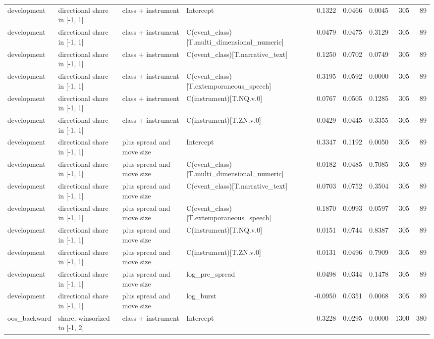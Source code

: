 \begin{tabular}{llllrrrrr}
development & directional share in [-1, 1] & class + instrument & Intercept & 0.1322 & 0.0466 & 0.0045 & 305 & 89 \\
development & directional share in [-1, 1] & class + instrument & C(event_class)[T.multi_dimensional_numeric] & 0.0479 & 0.0475 & 0.3129 & 305 & 89 \\
development & directional share in [-1, 1] & class + instrument & C(event_class)[T.narrative_text] & 0.1250 & 0.0702 & 0.0749 & 305 & 89 \\
development & directional share in [-1, 1] & class + instrument & C(event_class)[T.extemporaneous_speech] & 0.3195 & 0.0592 & 0.0000 & 305 & 89 \\
development & directional share in [-1, 1] & class + instrument & C(instrument)[T.NQ.v.0] & 0.0767 & 0.0505 & 0.1285 & 305 & 89 \\
development & directional share in [-1, 1] & class + instrument & C(instrument)[T.ZN.v.0] & -0.0429 & 0.0445 & 0.3355 & 305 & 89 \\
development & directional share in [-1, 1] & plus spread and move size & Intercept & 0.3347 & 0.1192 & 0.0050 & 305 & 89 \\
development & directional share in [-1, 1] & plus spread and move size & C(event_class)[T.multi_dimensional_numeric] & 0.0182 & 0.0485 & 0.7085 & 305 & 89 \\
development & directional share in [-1, 1] & plus spread and move size & C(event_class)[T.narrative_text] & 0.0703 & 0.0752 & 0.3504 & 305 & 89 \\
development & directional share in [-1, 1] & plus spread and move size & C(event_class)[T.extemporaneous_speech] & 0.1870 & 0.0993 & 0.0597 & 305 & 89 \\
development & directional share in [-1, 1] & plus spread and move size & C(instrument)[T.NQ.v.0] & 0.0151 & 0.0744 & 0.8387 & 305 & 89 \\
development & directional share in [-1, 1] & plus spread and move size & C(instrument)[T.ZN.v.0] & 0.0131 & 0.0496 & 0.7909 & 305 & 89 \\
development & directional share in [-1, 1] & plus spread and move size & log_pre_spread & 0.0498 & 0.0344 & 0.1478 & 305 & 89 \\
development & directional share in [-1, 1] & plus spread and move size & log_burst & -0.0950 & 0.0351 & 0.0068 & 305 & 89 \\
oos_backward & share, winsorized to [-1, 2] & class + instrument & Intercept & 0.3228 & 0.0295 & 0.0000 & 1300 & 380 \\

\end{tabular}

